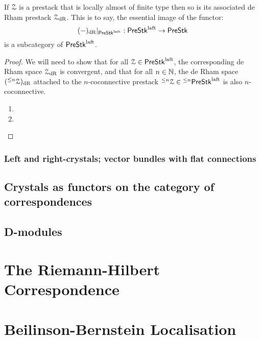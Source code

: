                 \begin{proposition} \label{prop: laft_de_rham_spaces}
                    If $\mathcal{Z}$ is a prestack that is locally almost of finite type then so is its associated de Rham prestack $\mathcal{Z}_{\mathrm{dR}}$. This is to say, the essential image of the functor:
                        $$(-)_{\mathrm{dR}}|_{\mathsf{Pre}\mathsf{Stk}^{\mathrm{laft}}}: \mathsf{Pre}\mathsf{Stk}^{\mathrm{laft}} \to \mathsf{Pre}\mathsf{Stk}$$
                    is a subcategory of $\mathsf{Pre}\mathsf{Stk}^{\mathrm{laft}}$.
                \end{proposition}
                    \begin{proof}
                        We will need to show that for all $\mathcal{Z} \in \mathsf{Pre}\mathsf{Stk}^{\mathrm{laft}}$, the corresponding de Rham space $\mathcal{Z}_{\mathrm{dR}}$ is convergent, and that for all $n \in \mathbb{N}$, the de Rham space $({}^{\leq n}\mathcal{Z})_{\mathrm{dR}}$ attached to the $n$-coconnective prestack ${}^{\leq n}\mathcal{Z} \in {}^{\leq n}\mathsf{Pre}\mathsf{Stk}^{\mathrm{laft}}$ is also $n$-coconnective.
                            \begin{enumerate}
                                \item 
                                \item 
                            \end{enumerate}
                    \end{proof}
                
                \begin{remark} \label{remark: universal_property_of_de_rham_spaces}
                    
                \end{remark}
                    
            \subsubsection{Left and right-crystals; vector bundles with flat connections}
        
        \subsection{Crystals as functors on the category of correspondences}
        
        \subsection{D-modules}
        
    \section{The Riemann-Hilbert Correspondence}
    
    \section{Beilinson-Bernstein Localisation}